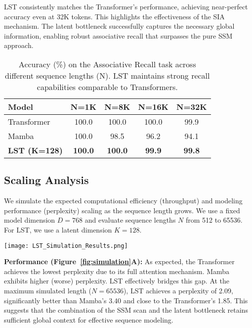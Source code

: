 \documentclass[10pt,twocolumn,letterpaper]{article}
\begin{document}
LST consistently matches the Transformer's performance, achieving near-perfect accuracy even at 32K tokens. This highlights the effectiveness of the SIA mechanism. The latent bottleneck successfully captures the necessary global information, enabling robust associative recall that surpasses the pure SSM approach.

\begin{table}[t]
\centering
\small
\begin{tabular}{@{}lcccc@{}}
\toprule
\textbf{Model} & \textbf{N=1K} & \textbf{N=8K} & \textbf{N=16K} & \textbf{N=32K} \\
\midrule
Transformer & 100.0 & 100.0 & 100.0 & 99.9 \\
Mamba & 100.0 & 98.5 & 96.2 & 94.1 \\
\textbf{LST (K=128)} & \textbf{100.0} & \textbf{100.0} & \textbf{99.9} & \textbf{99.8} \\
\bottomrule
\end{tabular}
\caption{Accuracy (\%) on the Associative Recall task across different sequence lengths (N). LST maintains strong recall capabilities comparable to Transformers.}
\label{tab:associative_recall}
\end{table}

\subsection{Scaling Analysis}

We simulate the expected computational efficiency (throughput) and modeling performance (perplexity) scaling as the sequence length grows. We use a fixed model dimension \(D=768\) and evaluate sequence lengths \(N\) from 512 to 65536. For LST, we use a latent dimension \(K=128\).

\begin{figure*}[t]
\centering
\texttt{[image: LST\_Simulation\_Results.png]}
\caption{Simulated trade-off between perplexity (lower is better) and throughput (tokens/s, log-log scale) as sequence length grows. LST approaches Transformer-level perplexity while retaining the near-linear efficiency scaling of Mamba.}
\label{fig:simulation}
\end{figure*}

\textbf{Performance (Figure~\ref{fig:simulation}A):} As expected, the Transformer achieves the lowest perplexity due to its full attention mechanism. Mamba exhibits higher (worse) perplexity. LST effectively bridges this gap. At the maximum simulated length (\(N=65536\)), LST achieves a perplexity of 2.09, significantly better than Mamba's 3.40 and close to the Transformer's 1.85. This suggests that the combination of the SSM scan and the latent bottleneck retains sufficient global context for effective sequence modeling.
\end{document}
